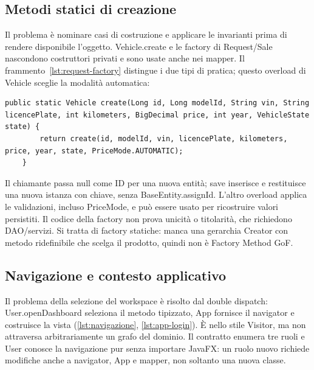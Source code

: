 \subsection{Metodi statici di creazione}
Il problema è nominare casi di costruzione e applicare le invarianti
prima di rendere disponibile l'oggetto. Vehicle.create e le factory di
Request/Sale nascondono costruttori privati e sono usate anche nei mapper.
Il frammento~\ref{lst:request-factory} distingue i due tipi di pratica;
questo overload di Vehicle sceglie la modalità automatica:

\noindent\begin{minipage}{\linewidth}
\begin{lstlisting}[firstnumber=40,gobble=4,caption={Overload completo della factory che sceglie AUTOMATIC; validazione delegata omessa.},label=lst:vehicle-factory]
    public static Vehicle create(Long id, Long modelId, String vin, String licencePlate, int kilometers, BigDecimal price, int year, VehicleState state) {
        return create(id, modelId, vin, licencePlate, kilometers, price, year, state, PriceMode.AUTOMATIC);
    }
\end{lstlisting}
\end{minipage}

Il chiamante passa null come ID per una nuova entità; save inserisce e
restituisce una nuova istanza con chiave, senza BaseEntity.assignId.
L'altro overload applica le validazioni, incluso PriceMode, e può essere
usato per ricostruire valori persistiti. Il codice della factory non
prova unicità o titolarità, che richiedono DAO/servizi. Si tratta di factory
statiche: manca una gerarchia Creator con metodo ridefinibile che scelga
il prodotto, quindi non è Factory Method GoF.

{\raggedright
\subsection{Navigazione e contesto applicativo}
Il problema della selezione del workspace è risolto dal double dispatch:
User.openDashboard seleziona il metodo tipizzato, App fornisce il navigator
e costruisce la vista (\ref{lst:navigazione}, \ref{lst:app-login}). È nello
stile Visitor, ma non attraversa arbitrariamente un grafo del dominio.
Il contratto enumera tre ruoli e User conosce la navigazione pur senza
importare JavaFX: un ruolo nuovo richiede modifiche anche a navigator,
App e mapper, non soltanto una nuova classe.\par}


